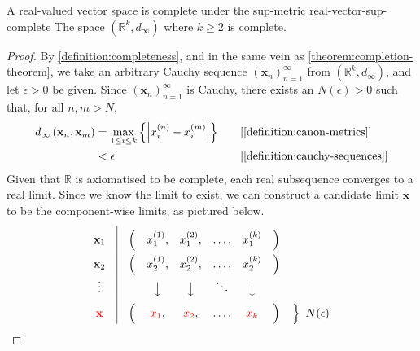 \documentclass{article}
\renewcommand*\vec{\mathbf}
\numberwithin{equation}{section}
\numberwithin{figure}{section}
\begin{document}
\begin{theorem}{A real-valued vector space is complete under the sup-metric}
            {real-vector-sup-complete}
    The space $ \left( \mathbb{R}^k, d_\infty \right) $ where $ k \geq 2 $ is
    complete.
    \begin{proof}
        By \cref{definition:completeness}, and in the same vein as
        \cref{theorem:completion-theorem}, we take an arbitrary Cauchy sequence
        $ \left( \vec{x}_n \right)_{n=1}^\infty $ from $ \left( \mathbb{R}^k,
        d_\infty \right) $, and let $ \epsilon > 0 $ be given. Since $ \left(
        \vec{x}_n \right)_{n=1}^\infty $ is Cauchy,
        there exists an $ N(\epsilon) > 0 $ such that, for all $ n, m > N $,
        \begin{alignat}{2}
            d_\infty\left( \vec{x}_n, \vec{x}_m \right) &= \max_{1 \leq i \leq
            k}\left\{ \left\vert x_i^{(n)} - x_{i}^{(m)} \right\vert
            \right\}\quad &&\text{[\Cref{definition:canon-metrics}]}\\
            &< \epsilon &&\text{[\Cref{definition:cauchy-sequences}]}
        \end{alignat}
        Given that $ \mathbb{R} $ is axiomatised to be complete, each real
        subsequence converges to a real limit. Since we know the limit to exist,
        we can construct a candidate limit $ \vec{x} $ to be the component-wise
        limits, as pictured below.
        \begin{equation*}
            \renewcommand\arraystretch{1.8}
            \begin{matrix}
                \vec{x}_1 & \vline & \Big( & x_1^{(1)}, & x_1^{(2)}, & \ldots,
                    & x_1^{(k)} & \Big) \\
                \vec{x}_2 & \vline & \Big( & x_2^{(1)}, & x_2^{(2)}, & \ldots,
                    & x_2^{(k)} & \Big) \\
                \vdots & \vline & & \big\downarrow & \big\downarrow & \ddots &
                    \big\downarrow & \\
                \color{red}{\vec{x}} & \vline & \Big( & {\color{red}x_1}, &
                    {\color{red}x_2}, & \ldots, & {\color{red}x_k} & \Big) &
                    \begin{rcases}\vphantom{\Big)}\end{rcases}\,\,N(\epsilon)
            \end{matrix}
        \end{equation*}


\end{proof}
\end{theorem}
\end{document}
